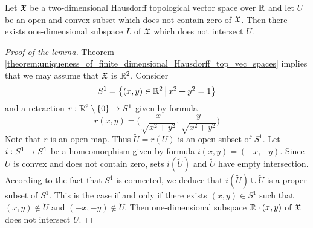 \begin{lemma}\label{lemma:two_dimensional_hyperplane_separation}
Let ${\mathfrak X}$ be a two-dimensional Hausdorff topological vector space over ${\mathbb R}$ and let $U$ be an open and convex subset which does not contain zero of ${\mathfrak X}$. Then there exists one-dimensional subspace $L$ of ${\mathfrak X}$ which does not intersect $U$. 
\end{lemma}
\begin{proof}[Proof of the lemma]
Theorem \ref{theorem:uniqueness_of_finite_dimensional_Hausdorff_top_vec_spaces} implies that we may assume that ${\mathfrak X}$ is ${\mathbb R}^2$. Consider
$$S^1 = \big\{(x, y)\in {\mathbb R}^2\,\big|\,x^2 + y^2 = 1\big\}$$
and a retraction $r:{\mathbb R}^2\setminus \{0\} \rightarrow S^1$ given by formula 
$$r(x, y) = \bigg(\frac{x}{\sqrt{x^2 + y^2}},\frac{y}{\sqrt{x^2 + y^2}}\bigg)$$
Note that $r$ is an open map. Thus $\tilde{U} = r(U)$ is an open subset of $S^1$. Let $i:S^1\rightarrow S^1$ be a homeomorphism given by formula $i(x, y) = (-x, -y)$. Since $U$ is convex and does not contain zero, sets $i(\tilde{U})$ and $\tilde{U}$ have empty intersection. According to the fact that $S^1$ is connected, we deduce that $i(\tilde{U}) \cup \tilde{U}$ is a proper subset of $S^1$. This is the case if and only if there exists $(x, y) \in S^1$ such that $(x, y) \not \in \tilde{U}$ and $(-x, -y) \not \in \tilde{U}$. Then one-dimensional subspace ${\mathbb R} \cdot (x, y)$ of ${\mathfrak X}$ does not intersect $U$.
\end{proof}


